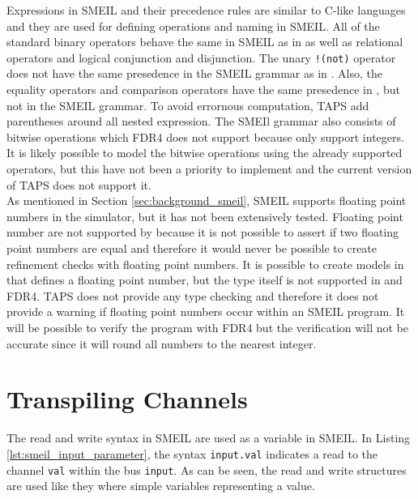 Expressions in SMEIL and their precedence rules are similar to C-like languages and they are used for defining operations and naming in SMEIL. All of the standard binary operators behave the same in SMEIL as in \cspm{} as well as relational operators and logical conjunction and disjunction. The unary \texttt{!(not)} operator does not have the same presedence in the SMEIL grammar as in \cspm{}. Also, the equality operators and comparison operators have the same presedence in \cspm{}, but not in the SMEIL grammar. To avoid errornous computation, TAPS add parentheses around all nested expression. The SMEIl grammar also consists of bitwise operations which FDR4 does not support because \cspm{} only support integers. It is likely possible to model the bitwise operations using the already supported operators, but this have not been a priority to implement and the current version of TAPS does not support it.\\

As mentioned in Section \ref{sec:background_smeil}, SMEIL supports floating point numbers in the simulator, but it has not been extensively tested. Floating point number are not supported by \cspm{}\cite{Scattergood2011} because it is not possible to assert if two floating point numbers are equal and therefore it would never be possible to create refinement checks with floating point numbers. It is possible to create models in \cspm{} that defines a floating point number, but the type itself is not supported in \cspm{} and FDR4. TAPS does not provide any type checking and therefore it does not provide a warning if floating point numbers occur within an SMEIL program. It will be possible to verify the program with FDR4 but the verification will not be accurate since it will round all numbers to the nearest integer.
\section{Transpiling Channels}
 The read and write syntax in SMEIL are used as a variable in SMEIL. In Listing \ref{lst:smeil_input_parameter}, the syntax \texttt{input.val} indicates a read to the channel \texttt{val} within the bus \texttt{input}. As can be seen, the read and write structures are used like they where simple variables representing a value.

